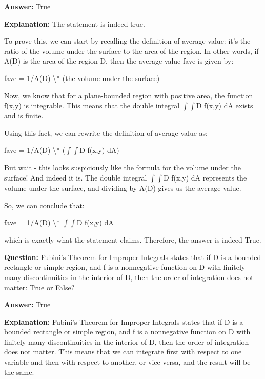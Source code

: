 \documentclass{article}
\begin{document}
                \textbf{Answer:} True

                \textbf{Explanation:} The statement is indeed true.

To prove this, we can start by recalling the definition of average value: it's the ratio of the volume under the surface to the area of the region. In other words, if A(D) is the area of the region D, then the average value fave is given by:

fave = 1/A(D) {\textbackslash}* (the volume under the surface)

Now, we know that for a plane-bounded region with positive area, the function f(x,y) is integrable. This means that the double integral \ensuremath{\int}\ensuremath{\int}D f(x,y) dA exists and is finite.

Using this fact, we can rewrite the definition of average value as:

fave = 1/A(D) {\textbackslash}* (\ensuremath{\int}\ensuremath{\int}D f(x,y) dA)

But wait - this looks suspiciously like the formula for the volume under the surface! And indeed it is. The double integral \ensuremath{\int}\ensuremath{\int}D f(x,y) dA represents the volume under the surface, and dividing by A(D) gives us the average value.

So, we can conclude that:

fave = 1/A(D) {\textbackslash}* \ensuremath{\int}\ensuremath{\int}D f(x,y) dA

which is exactly what the statement claims. Therefore, the answer is indeed True.
                
                \vspace{0.5cm} 
        
            
                \textbf {Question:} Fubini's Theorem for Improper Integrals states that if D is a bounded rectangle or simple region, and f is a nonnegative function on D with finitely many discontinuities in the interior of D, then the order of integration does not matter: True or False?
                
                \textbf{Answer:} True

                \textbf{Explanation:} Fubini's Theorem for Improper Integrals states that if D is a bounded rectangle or simple region, and f is a nonnegative function on D with finitely many discontinuities in the interior of D, then the order of integration does not matter. This means that we can integrate first with respect to one variable and then with respect to another, or vice versa, and the result will be the same.
\end{document}
